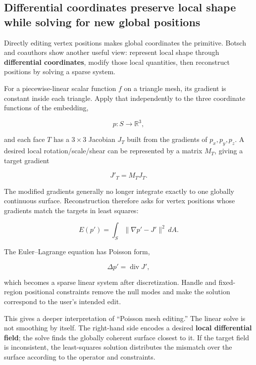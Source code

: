 \subsection{Differential coordinates preserve local shape while solving for new global positions}\label{03-visual-computing-i-ch002-differential-coordinates-preserve-local-shape-while-solving-for-new-global-positions}

\hypertarget{03-visual-computing-i-ch002-differential-coordinates-preserve-local-shape-while-solving-for-new-global-positions}{}

Directly editing vertex positions makes global coordinates the primitive. Botsch and coauthors show another useful view: represent local shape through \textbf{differential coordinates}, modify those local quantities, then reconstruct positions by solving a sparse system.

For a piecewise-linear scalar function \(f\) on a triangle mesh, its gradient is constant inside each triangle. Apply that independently to the three coordinate functions of the embedding,

\[
p:S\rightarrow\mathbb R^3,
\]

and each face \(T\) has a \(3\times3\) Jacobian \(J_T\) built from the gradients of \(p_x,p_y,p_z\). A desired local rotation/scale/shear can be represented by a matrix \(M_T\), giving a target gradient

\[
J'_T=M_TJ_T.
\]

The modified gradients generally no longer integrate exactly to one globally continuous surface. Reconstruction therefore asks for vertex positions whose gradients match the targets in least squares:

\[
E(p')
=
\int_S
\|\nabla p'-J'\|^2\,dA.
\]

The Euler--Lagrange equation has Poisson form,

\[
\Delta p'
=
\operatorname{div}J',
\]

which becomes a sparse linear system after discretization. Handle and fixed-region positional constraints remove the null modes and make the solution correspond to the user's intended edit.

This gives a deeper interpretation of ``Poisson mesh editing.'' The linear solve is not smoothing by itself. The right-hand side encodes a desired \textbf{local differential field}; the solve finds the globally coherent surface closest to it. If the target field is inconsistent, the least-squares solution distributes the mismatch over the surface according to the operator and constraints.

